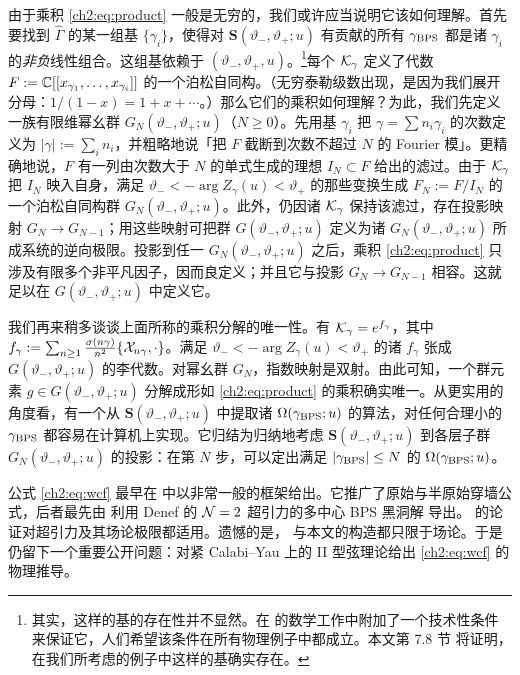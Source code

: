 由于乘积 \eqref{ch2:eq:product} 一般是无穷的，我们或许应当说明它该如何理解。首先要找到 $\hat\Gamma$ 的某一组基 $\{\gamma_i\}$，使得对 $\mathbf{S}(\vartheta_-, \vartheta_+; u)$ 有贡献的所有 $\gamma_{\rm BPS}$ 都是诸 $\gamma_i$ 的\emph{非负}线性组合。这组基依赖于 $(\vartheta_-, \vartheta_+, u)$。\footnote{其实，这样的基的存在性并不显然。在 \cite{ks1} 的数学工作中附加了一个技术性条件来保证它，人们希望该条件在所有物理例子中都成立。本文第 7.8 节%
将证明，在我们所考虑的例子中这样的基确实存在。}每个 $\mathcal{K}_\gamma$ 定义了代数 $F := \mathbb{C}[[x_{\gamma_1}, \dots, x_{\gamma_i}]]$ 的一个泊松自同构。（无穷泰勒级数出现，是因为我们展开分母：$1/(1-x) = 1 + x + \cdots$。）那么它们的乘积如何理解？为此，我们先定义一族有限维幂幺群 $G_N(\vartheta_-, \vartheta_+; u)$（$N \ge 0$）。先用基 $\gamma_i$ 把 $\gamma = \sum n_i \gamma_i$ 的次数定义为 $\vert \gamma \vert := \sum_i n_i$，并粗略地说「把 $F$ 截断到次数不超过 $N$ 的 Fourier 模」。更精确地说，$F$ 有一列由次数大于 $N$ 的单式生成的理想 $I_N \subset F$ 给出的滤过。由于 $\mathcal{K}_\gamma$ 把 $I_N$ 映入自身，满足 $\vartheta_- < -\arg Z_\gamma(u) < \vartheta_+$ 的那些变换生成 $F_N := F / I_N$ 的一个泊松自同构群 $G_N(\vartheta_-, \vartheta_+; u)$。此外，仍因诸 $\mathcal{K}_\gamma$ 保持该滤过，存在投影映射 $G_N \to G_{N-1}$；用这些映射可把群 $G(\vartheta_-, \vartheta_+; u)$ 定义为诸 $G_N(\vartheta_-, \vartheta_+; u)$ 所成系统的逆向极限。投影到任一 $G_N(\vartheta_-, \vartheta_+; u)$ 之后，乘积 \eqref{ch2:eq:product} 只涉及有限多个非平凡因子，因而良定义；并且它与投影 $G_N \to G_{N-1}$ 相容。这就足以在 $G(\vartheta_-, \vartheta_+; u)$ 中定义它。

我们再来稍多谈谈上面所称的乘积分解的唯一性。有 $\mathcal{K}_\gamma = e^{f_\gamma}$，其中 $f_\gamma := \sum_{n \ge 1} \frac{\sigma(n\gamma)}{n^2} \{ \mathcal{X}_{n \gamma}, \cdot \}$。满足 $\vartheta_- < -\arg Z_\gamma(u) < \vartheta_+$ 的诸 $f_\gamma$ 张成 $G(\vartheta_-, \vartheta_+; u)$ 的李代数。对幂幺群 $G_N$，指数映射是双射。由此可知，一个群元素 $g \in G(\vartheta_-, \vartheta_+; u)$ 分解成形如 \eqref{ch2:eq:product} 的乘积确实唯一。从更实用的角度看，有一个从 $\mathbf{S}(\vartheta_-, \vartheta_+; u)$ 中提取诸 $\Omega(\gamma_{\rm BPS}; u)$ 的算法，对任何合理小的 $\gamma_{\rm BPS}$ 都容易在计算机上实现。它归结为归纳地考虑 $\mathbf{S}(\vartheta_-, \vartheta_+; u)$ 到各层子群 $G_N(\vartheta_-, \vartheta_+; u)$ 的投影：在第 $N$ 步，可以定出满足 $\vert \gamma_{\rm BPS} \vert \le N$ 的 $\Omega(\gamma_{\rm BPS}; u)$。

公式 \eqref{ch2:eq:wcf} 最早在 \cite{ks1} 中以非常一般的框架给出。它推广了原始与半原始穿墙公式，后者最先由 \cite{Denef:2007vg} 利用 Denef 的 $\mathcal{N}=2$ 超引力的多中心 BPS 黑洞解 \cite{Denef:2000nb} 导出。\cite{Denef:2007vg} 的论证对超引力及其场论极限都适用。遗憾的是，\cite{Gaiotto:2008cd} 与本文的构造都只限于场论。于是仍留下一个重要公开问题：对紧 Calabi–Yau 上的 II 型弦理论给出 \eqref{ch2:eq:wcf} 的物理推导。

